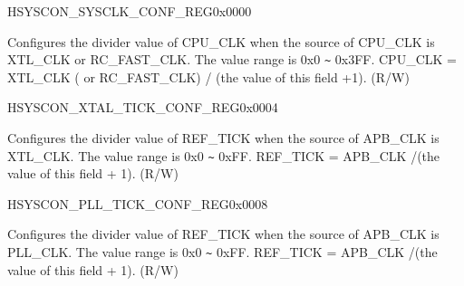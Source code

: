 \begin{register}{H}{SYSCON\_SYSCLK\_CONF\_REG}{0x0000}\label{regdesc:SYSCONSYSCLKCONFREG}
    \regnewline%
    \begin{regdesc}\begin{reglist}
    \label{fielddesc:SYSCONPREDIVCNT}\item [SYSCON\_PRE\_DIV\_CNT] Configures the divider value of CPU\_CLK when the source of CPU\_CLK is XTL\_CLK or RC\_FAST\_CLK. The value range is 0x0 \verb+~+ 0x3FF. CPU\_CLK =  XTL\_CLK ( or RC\_FAST\_CLK) / (the value of this field +1). (R/W)
    \end{reglist}\end{regdesc}
    \end{register}


    \begin{register}{H}{SYSCON\_XTAL\_TICK\_CONF\_REG}{0x0004}\label{regdesc:SYSCONXTALTICKCONFREG}
    \regnewline%
    \begin{regdesc}\begin{reglist}
    \label{fielddesc:SYSCONXTALTICKNUM}\item [SYSCON\_XTAL\_TICK\_NUM] Configures the divider value of REF\_TICK when the source of APB\_CLK is XTL\_CLK. The value range is 0x0 \verb+~+ 0xFF. REF\_TICK = APB\_CLK /(the value of this field + 1). (R/W)
    \end{reglist}\end{regdesc}
    \end{register}


    \begin{register}{H}{SYSCON\_PLL\_TICK\_CONF\_REG}{0x0008}\label{regdesc:SYSCONPLLTICKCONFREG}
    \regnewline%
    \begin{regdesc}\begin{reglist}
    \label{fielddesc:SYSCONPLLTICKNUM}\item [SYSCON\_PLL\_TICK\_NUM] Configures the divider value of REF\_TICK when the source of APB\_CLK is PLL\_CLK. The value range is 0x0 \verb+~+ 0xFF. REF\_TICK = APB\_CLK /(the value of this field + 1). (R/W)
    \end{reglist}\end{regdesc}
    \end{register}


